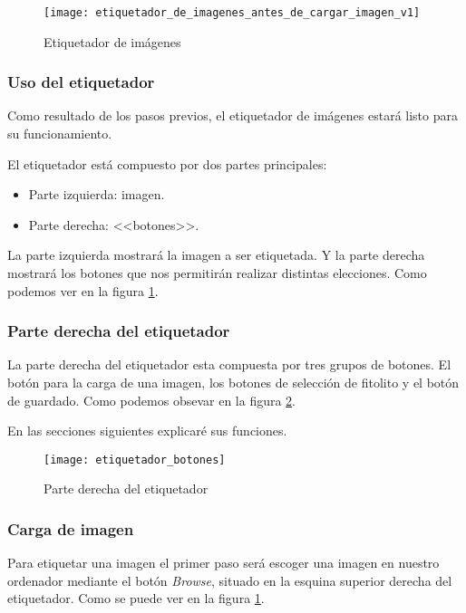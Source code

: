 \begin{figure}[h]
\centering
\texttt{[image: etiquetador\_de\_imagenes\_antes\_de\_cargar\_imagen\_v1]}
\caption{Etiquetador de imágenes}
\label{fig:E.4.3}
\end{figure}

\subsubsection{Uso del etiquetador}

Como resultado de los pasos previos, el etiquetador de imágenes estará listo para su funcionamiento. 

El etiquetador está compuesto por dos partes principales:

\begin{itemize}
	\item Parte izquierda: imagen.
	\item Parte derecha: \textrm{<<botones>>}.	
\end{itemize}

La parte izquierda mostrará la imagen a ser etiquetada. Y la parte derecha mostrará los botones que nos permitirán realizar distintas elecciones. Como podemos ver en la figura \ref{fig:E.4.3}.

\subsubsection{Parte derecha del etiquetador}
La parte derecha del etiquetador esta compuesta por tres grupos de botones. El botón para la carga de una imagen, los botones de selección de fitolito y el botón de guardado. Como podemos obsevar en la figura \ref{fig:E.4.7}. 

En las secciones siguientes explicaré sus funciones. 

\begin{figure}[h]
\centering
\texttt{[image: etiquetador\_botones]}
\caption{Parte derecha del etiquetador}
\label{fig:E.4.7}
\end{figure}

\subsubsection{Carga de imagen}

Para etiquetar una imagen el primer paso será escoger una imagen en nuestro ordenador mediante el botón \textit{Browse}, situado en la esquina superior derecha del etiquetador. Como se puede ver en la figura \ref{fig:E.4.3}.

